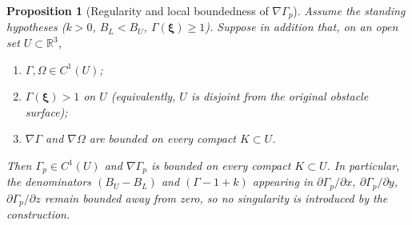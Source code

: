 \documentclass[11pt]{article}
\newtheorem{proposition}[theorem]{Proposition}
\theoremstyle{remark}
\newcommand{\R}{\mathbb{R}}
\newcommand{\G}{\Gamma}
\newcommand{\Gp}{\Gamma_p}
\newcommand{\Om}{\Omega}
\newcommand{\xib}{\bm{\xi}}
\begin{document}
\begin{proposition}[Regularity and local boundedness of $\nabla\Gp$]
\label{prop:regularity}
Assume the standing hypotheses ($k>0$, $B_L<B_U$, $\G(\xib)\ge 1$). Suppose in addition that, on an open set $U\subset\R^3$,
\begin{enumerate}
    \item[\textnormal{(i)}] $\G,\Om\in C^{1}(U)$;
    \item[\textnormal{(ii)}] $\G(\xib)>1$ on $U$ \textnormal{(}equivalently, $U$ is disjoint from the original obstacle surface\textnormal{)};
    \item[\textnormal{(iii)}] $\nabla\G$ and $\nabla\Om$ are bounded on every compact $K\subset U$.
\end{enumerate}
Then $\Gp\in C^{1}(U)$ and $\nabla\Gp$ is bounded on every compact $K\subset U$. In particular, the denominators $(B_U-B_L)$ and $(\G-1+k)$ appearing in $\partial\Gp/\partial x$, $\partial\Gp/\partial y$, $\partial\Gp/\partial z$ remain bounded away from zero, so no singularity is introduced by the construction.
\end{proposition}
\end{document}
